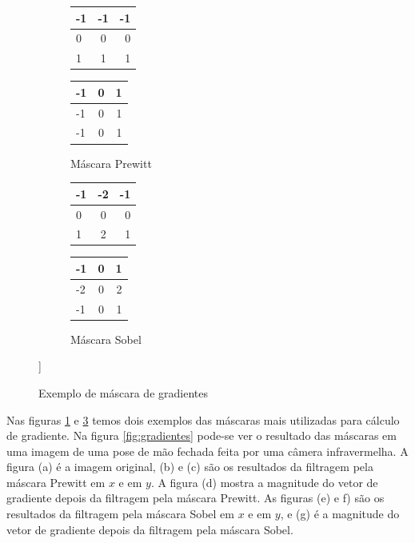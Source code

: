 \begin{figure}
	\centering
	\begin{subfigure}[b]{0.3\textwidth}
	\begin{center}
		\begin{tabular}{| l | c | r |}
		\hline
		-1 & -1 & -1 	\\ \hline
		0 & 0 & 0 		\\ \hline
		1 & 1 & 1 		\\ \hline
		\end{tabular}
		\begin{tabular}{| l | c | r |}
		\hline
		-1 & 0 & 1	 	\\ \hline
		-1 & 0 & 1 		\\ \hline
		-1 & 0 & 1 		\\ \hline
		\end{tabular}
		\caption{Máscara Prewitt}
		\label{fig:gradiente_prewitt}
	\end{center}
	\end{subfigure}
	\begin{subfigure}[b]{0.3\textwidth}
	\begin{center}
		\begin{tabular}{| l | c | r |}
		\hline
		-1 & -2 & -1 	\\ \hline
		0 & 0 & 0 		\\ \hline
		1 & 2 & 1 		\\ \hline
		\end{tabular}
		\begin{tabular}{| l | c | r |}
		\hline
		-1 & 0 & 1	 	\\ \hline
		-2 & 0 & 2 		\\ \hline
		-1 & 0 & 1 		\\ \hline
		\end{tabular}
		\caption{Máscara Sobel}
		\label{fig:gradiente_sobel}
	\end{center}
	\end{subfigure}]
	\caption{Exemplo de máscara de gradientes}
\end{figure}

Nas figuras \ref{fig:gradiente_prewitt} e \ref{fig:gradiente_sobel} temos dois exemplos das máscaras mais utilizadas para cálculo de gradiente. Na figura \ref{fig:gradientes} pode-se ver o resultado das máscaras em uma imagem de uma pose de mão fechada feita por uma câmera infravermelha. A figura (a) é a imagem original, (b) e (c) são os resultados da filtragem pela máscara Prewitt em \(x\) e em \(y\). A figura (d) mostra a magnitude do vetor de gradiente depois da filtragem pela máscara Prewitt. As figuras (e) e f) são os resultados da filtragem pela máscara Sobel em \(x\) e em \(y\), e (g) é a magnitude do vetor de gradiente depois da filtragem pela máscara Sobel.

